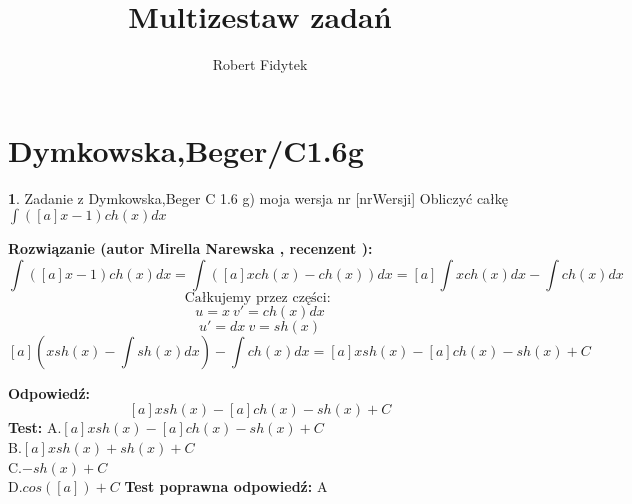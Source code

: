 \documentclass[12pt, a4paper]{article}
\title{Multizestaw zadań}
\author{Robert Fidytek}
\date{}
\theoremstyle{definition} %
\newtheorem{zad}{}
\newcommand{\kategoria}[1]{\section{#1}} %
\newcommand{\zadStart}[1]{\begin{zad}#1\newline} %
\newcommand{\zadStop}{\end{zad}}   %
\newcommand{\rozwStart}[2]{\noindent \textbf{Rozwiązanie (autor #1 , recenzent #2): }\newline} %
\newcommand{\odpStart}{\noindent \textbf{Odpowiedź:}\newline}    %
\newcommand{\odpStop}{\newline}                                             %
\newcommand{\testStart}{\noindent \textbf{Test:}\newline} %
\newcommand{\testStop}{\newline} %
\newcommand{\kluczStart}{\noindent \textbf{Test poprawna odpowiedź:}\newline} %
\newcommand{\kluczStop}{\newline} %
\begin{document}
\maketitle



\kategoria{Dymkowska,Beger/C1.6g}
\zadStart{Zadanie z Dymkowska,Beger C 1.6 g) moja wersja nr [nrWersji]}
Obliczyć całkę $\displaystyle \int ([a]x-1)ch(x) dx$
\zadStop
\rozwStart{Mirella Narewska}{}
$$\int ([a]x-1)ch(x) dx= \int \left([a]xch(x) -ch(x)\right) dx= [a] \int xch(x)dx -\int ch(x) dx$$
$$\text{Całkujemy przez części: }$$
$$u=x \  v'=ch(x)dx$$
$$u'=dx \ v=sh(x)$$
$$\displaystyle [a]\left(xsh(x) -\int sh(x)dx\right) -\int ch(x)dx =[a]xsh(x) -[a]ch(x)-sh(x)+C$$

\odpStart
$$[a]xsh(x) -[a]ch(x)-sh(x)+C$$
\odpStop
\testStart
A.$[a]xsh(x) -[a]ch(x)-sh(x)+C$
\\
B.$[a]xsh(x)+sh(x)+C$
\\
C.$-sh(x)+C$
\\
D.$cos([a])+C$
\testStop
\kluczStart
A
\kluczStop
\end{document}

